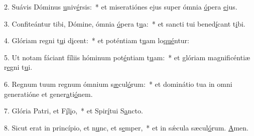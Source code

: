 2. Suávis Dóminus \uline{u}niv\uline{é}rsis:~* et miseratiónes ejus super ómnia \uline{ó}pera \uline{e}jus.\par 
3. Confiteántur tibi, Dómine, ómnia \uline{ó}pera t\uline{u}a:~* et sancti tui bened\uline{í}cant t\uline{i}bi.\par 
4. Glóriam regni t\uline{u}i d\uline{i}cent:~* et poténtiam t\uline{u}am lo\uline{qué}ntur:\par 
5. Ut notam fáciant fíliis hóminum pot\uline{é}ntiam t\uline{u}am:~* et glóriam magnificéntiæ r\uline{e}gni t\uline{u}i.\par 
6. Regnum tuum regnum ómnium s\uline{æ}cul\uline{ó}rum:~* et dominátio tua in omni generatióne et gener\uline{a}ti\uline{ó}nem.\par 
7. Glória Patri, et F\uline{í}l\uline{i}o,~* et Spir\uline{í}tui S\uline{a}ncto.\par 
8. Sicut erat in princípio, et n\uline{u}nc, et s\uline{e}mper,~* et in sǽcula sæcul\uline{ó}rum. \uline{A}men.\par 
